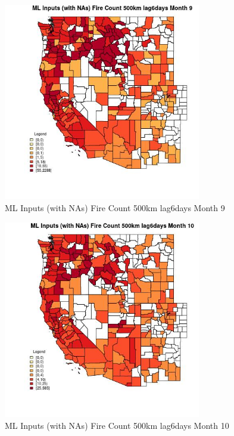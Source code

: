 \begin{figure} 
\centering  
\includegraphics[width=0.77\textwidth]{Code_Outputs/Report_ML_input_PM25_Step4_part_e_de_duplicated_aves_compiled_2019-05-21wNAs_CountyFire_Count_500km_lag6daysmedianMonth9.jpg} 
\caption{\label{fig:Report_ML_input_PM25_Step4_part_e_de_duplicated_aves_compiled_2019-05-21wNAsCountyFire_Count_500km_lag6daysmedianMonth9}ML Inputs (with NAs) Fire Count 500km lag6days Month 9} 
\end{figure} 
 

\begin{figure} 
\centering  
\includegraphics[width=0.77\textwidth]{Code_Outputs/Report_ML_input_PM25_Step4_part_e_de_duplicated_aves_compiled_2019-05-21wNAs_CountyFire_Count_500km_lag6daysmedianMonth10.jpg} 
\caption{\label{fig:Report_ML_input_PM25_Step4_part_e_de_duplicated_aves_compiled_2019-05-21wNAsCountyFire_Count_500km_lag6daysmedianMonth10}ML Inputs (with NAs) Fire Count 500km lag6days Month 10} 
\end{figure} 
 

